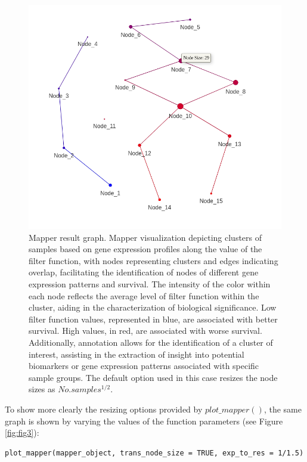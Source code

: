 \begin{figure}
\includegraphics[width=0.65\linewidth,height=0.4\textheight]{Figures/plot_mapper_object} \caption{Mapper result graph. Mapper visualization depicting clusters of samples based on gene expression profiles along the value of the filter function, with nodes representing clusters and edges indicating overlap, facilitating the identification of nodes of different gene expression patterns and survival. The intensity of the color within each node reflects the average level of filter function within the cluster, aiding in the characterization of biological significance. Low filter function values, represented in blue, are associated with better survival. High values, in red, are associated with worse survival. Additionally, annotation allows for the identification of a cluster of interest, assisting in the extraction of insight into potential biomarkers or gene expression patterns associated with specific sample groups. The default option used in this case resizes the node sizes as $No. samples^{1/2}$.}\label{fig:fig2}
\end{figure}

To show more clearly the resizing options provided by \(plot\_mapper()\), the same graph is shown by varying the values of the function parameters (see Figure \ref{fig:fig3}):

\begin{verbatim}
plot_mapper(mapper_object, trans_node_size = TRUE, exp_to_res = 1/1.5)
\end{verbatim}

